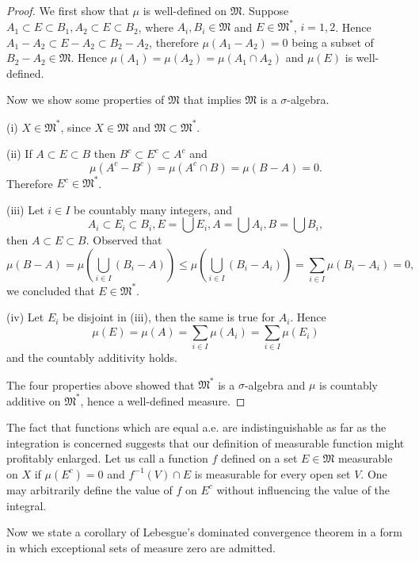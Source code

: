 \begin{proof}
We first show that $\mu$ is well-defined on $\mathfrak{M}$. Suppose $A_1\subset E\subset B_1,A_2\subset E\subset B_2$, where $A_i,B_i\in\mathfrak{M}$ and $E\in\mathfrak{M}^*$, $i=1,2$. Hence $A_1-A_2\subset E-A_2\subset B_2-A_2$, therefore $\mu(A_1-A_2)=0$ being a subset of $B_2-A_2\in\mathfrak{M}$. Hence $\mu \left( A_1 \right) =\mu \left( A_2 \right) =\mu \left( A_1\cap A_2 \right) $ and $\mu(E)$ is well-defined.\par
Now we show some properties of $\mathfrak{M}$ that implies $\mathfrak{M}$ is a $\sigma$-algebra.\par
(i) $X\in\mathfrak{M}^*$, since $X\in\mathfrak{M}$ and $\mathfrak{M}\subset\mathfrak{M}^*$.\par
(ii) If $A\subset E\subset B$ then $B^c\subset E^c\subset A^c$ and 
$$
\mu \left( A^c-B^c \right) =\mu \left( A^c\cap B \right) =\mu \left( B-A \right) =0.
$$
Therefore $E^c\in\mathfrak{M}^*$.\par
(iii) Let $i\in I$ be countably many integers, and 
$$
A_i\subset E_i\subset B_i,E=\bigcup{E_i},A=\bigcup{A_i},B=\bigcup{B_i},
$$
then $A\subset E\subset B$. Observed that 
$$
\mu \left( B-A \right) =\mu \left( \bigcup_{i\in I}{\left( B_i-A \right)} \right) \le \mu \left( \bigcup_{i\in I}{\left( B_i-A_i \right)} \right) =\sum_{i\in I}{\mu \left( B_i-A_i \right)}=0,
$$
we concluded that $E\in\mathfrak{M}^*$.\par
(iv) Let $E_i$ be disjoint in (iii), then the same is true for $A_i$. Hence 
$$
\mu \left( E \right) =\mu \left( A \right) =\sum_{i\in I}{\mu \left( A_i \right)}=\sum_{i\in I}{\mu \left( E_i \right)}
$$
and the countably additivity holds.\par
The four properties above showed that $\mathfrak{M}^*$ is a $\sigma$-algebra and $\mu$ is countably additive on $\mathfrak{M}^*$, hence a well-defined measure.
\end{proof}
The fact that functions which are equal a.e. are indistinguishable as far as the integration is concerned suggests that our definition of measurable function might profitably enlarged. Let us call a function $f$ defined on a set $E\in\mathfrak{M}$ measurable on $X$ if $\mu(E^c)=0$ and $f^{-1}(V)\cap E$ is measurable for every open set $V$. One may arbitrarily define the value of $f$ on $E^c$ without influencing the value of the integral.\par
Now we state a corollary of Lebesgue's dominated convergence theorem in a form in which exceptional sets of measure zero are admitted.
